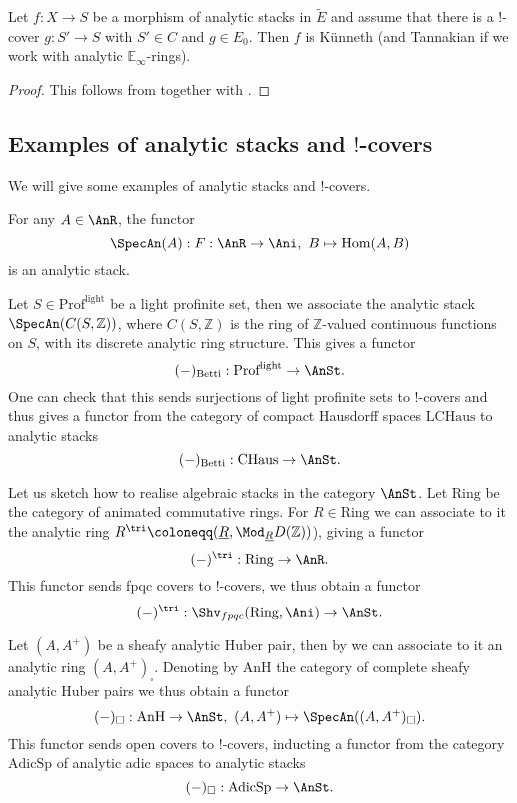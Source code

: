 \begin{corollary}
 Let $f: X \to S$ be a morphism of analytic stacks in $\tilde{E}$ and assume that there is a $!$-cover $g: S'\to S$ with $S'\in C$ and $g\in E_0$. Then $f$ is Künneth (and Tannakian if we work with analytic $\mathbb{E}_\infty$-rings).
\end{corollary}
\begin{proof}
    This  follows from  together with .
\end{proof}



\subsection{Examples of analytic stacks and $!$-covers}
We will give some examples of analytic stacks and $!$-covers.
\begin{example}\Cite[Lecture 19]{AnSt}
For any $A\in \AnR$, the functor 
\[
\SpecAn(A) : F: \AnR \to \Ani , \ B \mapsto \text{Hom}(A,B)
\]
is an analytic stack.
\end{example}
\begin{example}\Cite[Lecture 19]{AnSt}
 Let $S\in \text{Prof}^{\text{light}}$ be a light profinite set, then we associate the analytic stack $\SpecAn(C(S,\mathbb{Z}))$, where $C(S,\mathbb{Z})$ is the ring of $\mathbb{Z}$-valued continuous functions on $S$, with its discrete analytic ring structure. This gives a functor 
 \[
 (-)_{\text{Betti}}: \text{Prof}^{\text{light}} \to \AnSt.
 \]
 One can check that this sends surjections of light profinite sets to $!$-covers and thus gives a functor from the category of compact Hausdorff spaces $\text{LCHaus}$ to analytic stacks
 \[
 (-)_{\text{Betti}}: \text{CHaus} \to \AnSt.
 \]
\end{example}

\begin{example}
    Let us sketch how to realise algebraic stacks in the category $\AnSt$. Let $\text{Ring}$ be the category of animated commutative rings. For $R \in \text{Ring} $ we can associate to it the analytic ring $R^{\tri}\coloneqq (\underline{R},\Mod_{\underline{R}}D(\mathbb{Z}))$), giving a functor 
    \[
    (-)^{\tri}: \text{Ring} \to \AnR .   \]
    This functor sends fpqc covers to $!$-covers, we thus obtain a functor
     \[
    (-)^{\tri}: \Shv_{fpqc}(\text{Ring},\Ani) \to \AnSt.  \]
\end{example}


\begin{example}
 Let $(A,A^+)$ be a sheafy analytic Huber pair, then by \Cite[Proposition 3.34]{andreychev2021pseudocoherent} we can associate to it an analytic ring $(A,A^+)_{\square}$. Denoting by $\text{AnH}$ the category of complete sheafy analytic Huber pairs we thus obtain a functor 
 \[
 (-)_{\square}: \text{AnH} \to \AnSt,  \ (A,A^+) \mapsto \SpecAn((A,A^+)_{\square}).
 \]
 This functor sends open covers to $!$-covers, inducting a functor from the category $\text{AdicSp}$ of analytic adic spaces to analytic stacks
\[
 (-)_{\square}: \text{AdicSp} \to \AnSt.
\]
\end{example}



